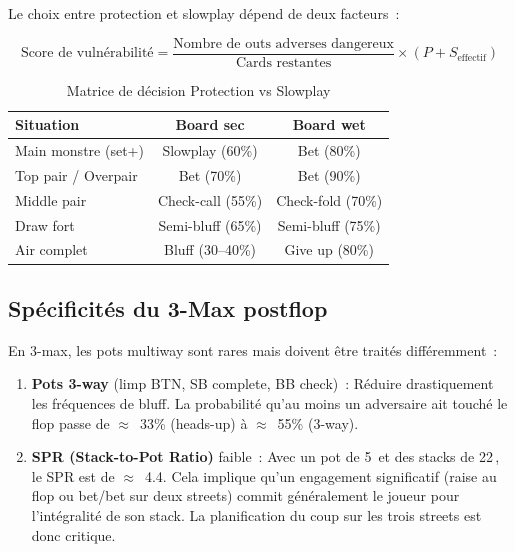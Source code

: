 \documentclass[a4paper,11pt]{article}
\newcommand{\bb}{\,\mathrm{bb}}
\begin{document}
Le choix entre protection et slowplay d\'epend de deux facteurs~:

\begin{equation}
\text{Score de vuln\'erabilit\'e} = \frac{\text{Nombre de outs adverses dangereux}}{\text{Cards restantes}} \times (P + S_{\text{effectif}})
\end{equation}

\begin{table}[H]
\centering
\caption{Matrice de d\'ecision Protection vs Slowplay}
\label{tab:protect_slow}
\begin{tabular}{l c c}
\toprule
\textbf{Situation} & \textbf{Board sec} & \textbf{Board wet} \\
\midrule
Main monstre (set+) & Slowplay (60\%) & Bet (80\%) \\
Top pair / Overpair & Bet (70\%) & Bet (90\%) \\
Middle pair & Check-call (55\%) & Check-fold (70\%) \\
Draw fort & Semi-bluff (65\%) & Semi-bluff (75\%) \\
Air complet & Bluff (30--40\%) & Give up (80\%) \\
\bottomrule
\end{tabular}
\end{table}

\subsection{Sp\'ecificit\'es du 3-Max postflop}

En 3-max, les pots multiway sont rares mais doivent \^etre trait\'es diff\'eremment~:

\begin{enumerate}[leftmargin=*]
\item \textbf{Pots 3-way} (limp BTN, SB complete, BB check)~: R\'eduire drastiquement les fr\'equences de bluff. La probabilit\'e qu'au moins un adversaire ait touch\'e le flop passe de $\approx$~33\% (heads-up) \`a $\approx$~55\% (3-way).

\item \textbf{SPR (Stack-to-Pot Ratio)} faible~: Avec un pot de 5\bb{} et des stacks de 22\bb, le SPR est de $\approx$~4.4. Cela implique qu'un engagement significatif (raise au flop ou bet/bet sur deux streets) commit g\'en\'eralement le joueur pour l'int\'egralit\'e de son stack. La planification du coup sur les trois streets est donc critique.
\end{enumerate}
\end{document}
